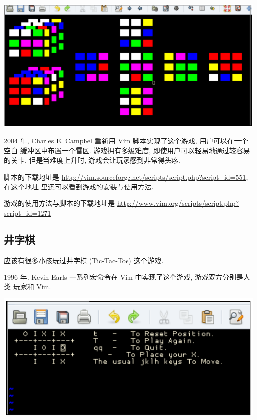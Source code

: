 \begin{center}
    \includegraphics[scale=0.7]{./images/page203-2.png}
\end{center}

2004 年, Charles E. Campbel 重新用 Vim 脚本实现了这个游戏, 用户可以在一个空白
缓冲区中布置一个雷区. 游戏拥有多级难度, 即使用户可以轻易地通过较容易的关卡,
但是当难度上升时, 游戏会让玩家感到非常得头疼.

脚本的下载地址是
\url{http://vim.sourceforge.net/scripts/script.php?script_id=551}, 在这个地址
里还可以看到游戏的安装与使用方法.

游戏的使用方法与脚本的下载地址是
\url{http://www.vim.org/scripts/script.php?script_id=1271}

\subsection{井字棋}
\label{subsec:tic_tac_toe}
应该有很多小孩玩过井字棋 (Tic-Tac-Toe) 这个游戏.

1996 年, Kevin Earls 一系列宏命令在 Vim 中实现了这个游戏, 游戏双方分别是人类
玩家和 Vim.

\begin{center}
    \includegraphics[scale=0.8]{./images/page204.png}
\end{center}

